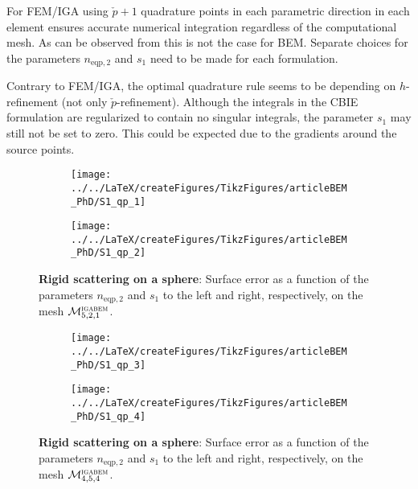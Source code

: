 For FEM/IGA using $\check{p}+1$ quadrature points in each parametric direction in each element ensures accurate numerical integration regardless of the computational mesh. As can be observed from  this is not the case for BEM. Separate choices for the parameters $n_{\mathrm{eqp},2}$ and $s_1$ need to be made for each formulation. 

Contrary to FEM/IGA, the optimal quadrature rule seems to be depending on $h$-refinement (not only $\check{p}$-refinement). Although the integrals in the CBIE formulation are regularized to contain no singular integrals, the parameter $s_1$ may still not be set to zero. This could be expected due to the gradients around the source points.

\begin{figure}
	\centering    
	\begin{subfigure}[t]{0.49\textwidth}
		\centering
		\texttt{[image: ../../LaTeX/createFigures/TikzFigures/articleBEM\_PhD/S1\_qp\_1]}
	\end{subfigure}%
	\hspace*{0.02\textwidth}%
	\begin{subfigure}[t]{0.49\textwidth}
		\centering
		\texttt{[image: ../../LaTeX/createFigures/TikzFigures/articleBEM\_PhD/S1\_qp\_2]}
	\end{subfigure}
	\caption{\textbf{Rigid scattering on a sphere}: Surface error as a function of the parameters $n_{\mathrm{eqp},2}$ and $s_1$ to the left and right, respectively, on the mesh ${\cal M}_{5,2,1}^{\textsc{igabem}}$.}
	\label{Fig3:S1_qp_M5p2}
\end{figure}
\begin{figure}
	\centering
	\begin{subfigure}[t]{0.49\textwidth}
		\centering
		\texttt{[image: ../../LaTeX/createFigures/TikzFigures/articleBEM\_PhD/S1\_qp\_3]}
	\end{subfigure}%
	\hspace*{0.02\textwidth}%
	\begin{subfigure}[t]{0.49\textwidth}
		\centering
		\texttt{[image: ../../LaTeX/createFigures/TikzFigures/articleBEM\_PhD/S1\_qp\_4]}
	\end{subfigure}
	\caption{\textbf{Rigid scattering on a sphere}: Surface error as a function of the parameters $n_{\mathrm{eqp},2}$ and $s_1$ to the left and right, respectively, on the mesh ${\cal M}_{4,5,4}^{\textsc{igabem}}$.}
	\label{Fig3:S1_qp_M4p5}
\end{figure}

